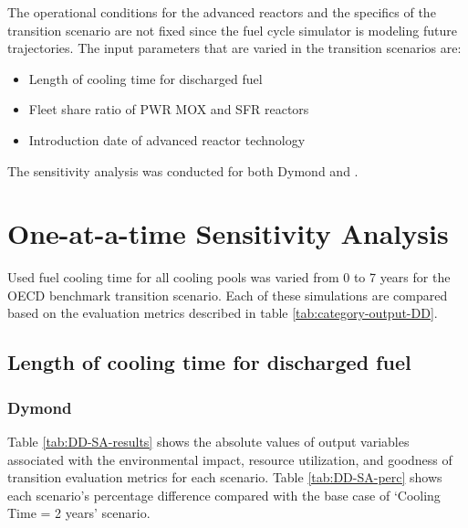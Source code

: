 The operational conditions for the advanced reactors and
the specifics of the transition scenario are not 
fixed since the fuel cycle simulator is modeling future 
trajectories. 
The input parameters that are varied in the
transition scenarios are: 
\begin{itemize}
    \item Length of cooling time for discharged fuel 
    \item Fleet share ratio of PWR MOX and SFR reactors 
	\item Introduction date of advanced reactor technology
\end{itemize}

The sensitivity analysis was conducted for both Dymond and \Cyclus. 

\section{One-at-a-time Sensitivity Analysis}
Used fuel cooling time for all cooling pools was varied from 
0 to 7 years for the OECD benchmark transition scenario. 
Each of these simulations are compared based on the evaluation 
metrics described in table \ref{tab:category-output-DD}.

\subsection{Length of cooling time for discharged fuel}
\subsubsection{\textbf{Dymond}}
Table \ref{tab:DD-SA-results} shows the absolute values of 
output variables associated with the environmental impact, 
resource utilization, and goodness of transition evaluation 
metrics for each scenario. 
Table \ref{tab:DD-SA-perc} shows each scenario's percentage 
difference compared with the base case of `Cooling Time = 2 years'
scenario.

